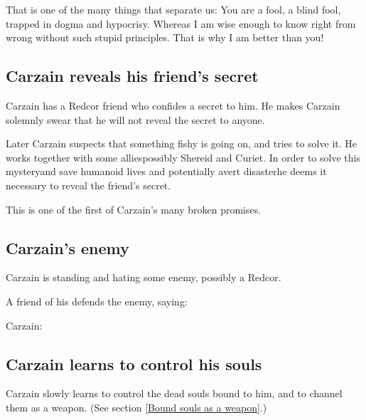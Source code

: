 \begin{garbage}
{That is one of the many things that separate us: You are a fool, a blind fool, trapped in dogma and hypocrisy. Whereas I am wise enough to know right from wrong without such stupid principles. That is why I am better than you!}







\subsection{Carzain reveals his friend's secret}
Carzain has a Redcor friend who confides a secret to him. He makes Carzain solemnly swear that he will not reveal the secret to anyone. 

Later Carzain suspects that something fishy is going on, and tries to solve it. He works together with some allies\dash possibly Shereid and Curiet. In order to solve this mystery\dash and save humanoid lives and potentially avert disaster\dash he deems it necessary to reveal the friend's secret. 

This is one of the first of Carzain's many broken promises.







\subsection{Carzain's \human{} enemy}
Carzain is standing and hating some enemy, possibly a Redcor. 

A friend of his defends the enemy, saying: 

Carzain: 







\subsection{Carzain learns to control his souls}
Carzain slowly learns to control the dead souls bound to him, and to channel them as a weapon. (See section \ref{Bound souls as a weapon}.)


\end{garbage}
